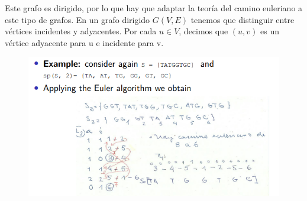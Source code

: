 Este grafo es dirigido, por lo que hay que adaptar la teoría del camino euleriano a este tipo de grafos. En un grafo dirigido $G(V, E)$ tenemos que distinguir entre vértices incidentes y adyacentes. Por cada $u \in V$, decimos que $(u, v)$ es un vértice adyacente para u e incidente para v. 

\begin{figure}[h]
\centering
\includegraphics[width = \textwidth]{figs/eulerian-dna.png}
\end{figure}
